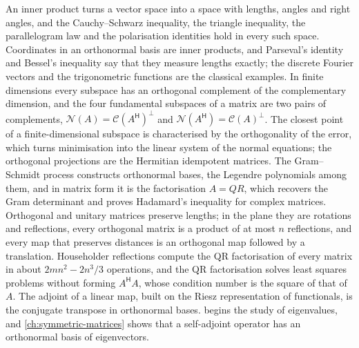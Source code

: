 \bigskip
An inner product turns a vector space into a space with lengths, angles and right angles, and the Cauchy--Schwarz inequality, the triangle inequality, the parallelogram law and the polarisation identities hold in every such space. Coordinates in an orthonormal basis are inner products, and Parseval's identity and Bessel's inequality say that they measure lengths exactly; the discrete Fourier vectors and the trigonometric functions are the classical examples. In finite dimensions every subspace has an orthogonal complement of the complementary dimension, and the four fundamental subspaces of a matrix are two pairs of complements, $\mathcal N(A)=\mathcal C(A^{\mathsf H})^\perp$ and $\mathcal N(A^{\mathsf H})=\mathcal C(A)^\perp$. The closest point of a finite-dimensional subspace is characterised by the orthogonality of the error, which turns minimisation into the linear system of the normal equations; the orthogonal projections are the Hermitian idempotent matrices. The Gram--Schmidt process constructs orthonormal bases, the Legendre polynomials among them, and in matrix form it is the factorisation $A=QR$, which recovers the Gram determinant and proves Hadamard's inequality for complex matrices. Orthogonal and unitary matrices preserve lengths; in the plane they are rotations and reflections, every orthogonal matrix is a product of at most $n$ reflections, and every map that preserves distances is an orthogonal map followed by a translation. Householder reflections compute the QR factorisation of every matrix in about $2mn^2-2n^3/3$ operations, and the QR factorisation solves least squares problems without forming $A^{\mathsf H}A$, whose condition number is the square of that of $A$. The adjoint of a linear map, built on the Riesz representation of functionals, is the conjugate transpose in orthonormal bases.  begins the study of eigenvalues, and \cref{ch:symmetric-matrices} shows that a self-adjoint operator has an orthonormal basis of eigenvectors.

\chapternotes

